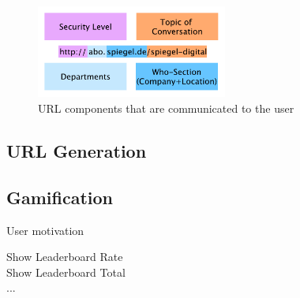 \begin{figure}[hHtbp]
\centering
\includegraphics[width=0.56\textwidth]{graphix/url_components.pdf}
\caption{URL components that are communicated to the user}
\label{fig:url_components}
\end{figure}
\subsection{URL Generation}

\subsection{Gamification}
User motivation

\begin{description}
	\item[Show Leaderboard Rate]
	\item[Show Leaderboard Total]
	\item[...]
\end{description}
